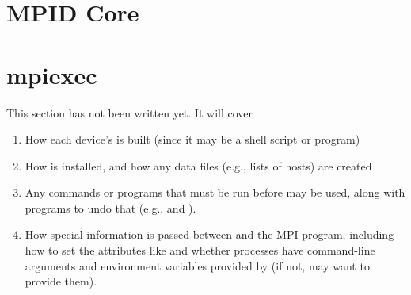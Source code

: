 \documentclass{article}
\begin{document}



\section{MPID Core}

%

\section{mpiexec}
This section has not been written yet.  It will cover
\begin{enumerate}
\item How each device's  is built (since it may be a shell
  script or program)
\item How  is installed, and how any data files (e.g., lists of
  hosts) are created
\item Any commands or programs that must be run before  may be
  used, along with programs to undo that (e.g.,  and
  ). 
\item How special information is passed between  and the MPI
  program, including how to set the attributes like  and
  whether processes have command-line arguments and environment variables
  provided by  (if not,  may want to provide
  them). 
\end{enumerate}
\end{document}
